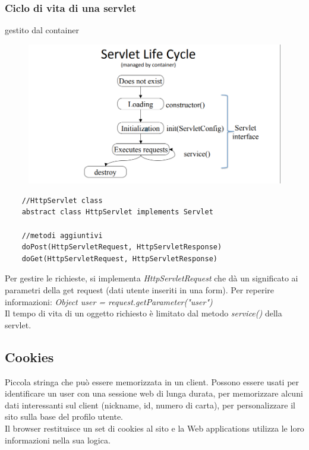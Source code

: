 \subsubsection{Ciclo di vita di una servlet} 
gestito dal container

\begin{figure}[H]
    \centering
    \includegraphics[scale=0.6]{Imm/servlet-life.PNG}
\end{figure}

\begin{lstlisting}
    //HttpServlet class
    abstract class HttpServlet implements Servlet
        
    //metodi aggiuntivi
    doPost(HttpServletRequest, HttpServletResponse)
    doGet(HttpServletRequest, HttpServletResponse)
\end{lstlisting}


Per gestire le richieste, si implementa \textit{HttpServletRequest} che dà un significato ai parametri della get request (dati utente inseriti in una form). Per reperire informazioni: \textit{Object user = request.getParameter("user")}\\
Il tempo di vita di un oggetto richiesto è limitato dal metodo \textit{service()} della servlet.

\subsection{Cookies}
Piccola stringa che può essere memorizzata in un client. Possono essere usati per identificare un user con una sessione web di lunga durata, per memorizzare alcuni dati interessanti sul client (nickname, id, numero di carta), per personalizzare il sito sulla base del profilo utente.\\
Il browser restituisce un set di cookies al sito e la Web applications utilizza le loro informazioni nella sua logica.

